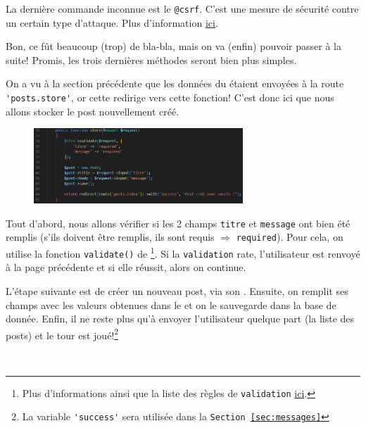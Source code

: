 \documentclass[internal]{nhitec_design}
\begin{document}
La dernière commande inconnue est le \verb|@csrf|. C'est une mesure de sécurité contre un certain type d'attaque. Plus d'information \href{https://laravel.com/docs/10.x/csrf}{ici}.

Bon, ce fût beaucoup (trop) de bla-bla, mais on va (enfin) pouvoir passer à la suite! Promis, les trois dernières méthodes seront bien plus simples.

On a vu à la section précédente que les données du \form{} étaient envoyées à la route \verb|'posts.store'|, or cette \route{} redirige vers cette fonction! C'est donc ici que nous allons stocker le post nouvellement créé.

\begin{figure}
    \vspace{-0.5cm}
    \includegraphics[width=0.7\textwidth]{figures-C1/post_store_controller.pdf}
\end{figure}
Tout d'abord, nous allons vérifier si les 2 champs \verb|titre| et \verb|message| ont bien été remplis (s'ils doivent être remplis, ils sont requis $\Rightarrow$ \verb|required|). Pour cela, on utilise la fonction \verb|validate()| de \laravel\footnote{Plus d'informations ainsi que la liste des règles de \texttt{validation} \href{https://laravel.com/docs/10.x/validation#quick-writing-the-validation-logic}{ici}.}. Si la \texttt{validation} rate, l'utilisateur est renvoyé à la page précédente et si elle réussit, alors on continue.

L'étape suivante est de créer un nouveau post, via son \model{}. Ensuite, on remplit ses champs avec les valeurs obtenues dans le \form{} et on le sauvegarde dans la base de donnée. Enfin, il ne reste plus qu'à envoyer l'utilisateur quelque part (la liste des posts) et le tour est joué!\footnote{La variable \verb|'success'| sera utilisée dans la \texttt{Section~\ref{sec:messages}}}

\





\newpage
\end{document}
